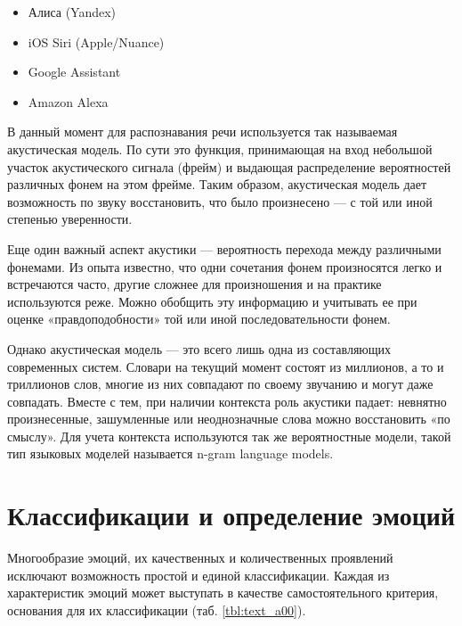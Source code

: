 \begin{itemize}
	\item Алиса (Yandex)
	\item iOS Siri (Apple/Nuance)
	\item Google Assistant
	\item Amazon Alexa
\end{itemize}

В данный момент для распознавания речи используется так называемая акустическая модель. По сути 
это функция, принимающая на вход небольшой участок акустического сигнала (фрейм) и выдающая распределение вероятностей различных фонем на этом фрейме. 
Таким образом, акустическая модель дает возможность по звуку восстановить, что было произнесено — с той или иной степенью уверенности.

Еще один важный аспект акустики — вероятность перехода между различными фонемами. 
Из опыта известно, что одни сочетания фонем произносятся легко и встречаются часто, другие сложнее для произношения и на практике используются реже.
Можно обобщить эту информацию и учитывать ее при оценке «правдоподобности» той или иной последовательности фонем.

Однако акустическая модель — это всего лишь одна из составляющих современных систем. Словари на текущий момент состоят из 
миллионов, а то и триллионов слов, многие из них совпадают по своему звучанию и могут даже совпадать. 
Вместе с тем, при наличии контекста роль акустики падает: невнятно произнесенные, зашумленные или неоднозначные слова можно восстановить «по смыслу».
Для учета контекста используются так же вероятностные модели, такой тип языковых моделей называется n-gram language models. 

\section{Классификации и определение эмоций}

Многообразие эмоций, их качественных и количественных проявлений исключают возможность простой и единой классификации. 
Каждая из характеристик эмоций может выступать в качестве самостоятельного критерия, основания для их классификации (таб. \ref{tbl:text_a00}).

